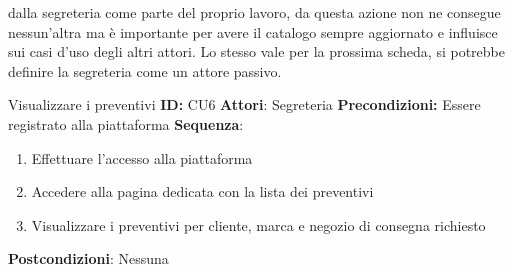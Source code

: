 \documentclass[a4paper, 11pt,oneside]{book}
\begin{document}
        dalla segreteria come parte del proprio lavoro, da questa azione non ne consegue nessun'altra ma è importante per avere il catalogo sempre
        aggiornato e influisce sui casi d'uso degli altri attori. Lo stesso vale per la prossima scheda, si potrebbe definire la segreteria come un attore passivo.
        \begin{mybox}{Visualizzare i preventivi}
            \textbf{ID:} CU6
            \tcbline
            \textbf{Attori}: Segreteria
            \tcbline
            \textbf{Precondizioni:} Essere registrato alla piattaforma
            \tcbline
            \textbf{Sequenza}: 
                \begin{enumerate}
                    \item Effettuare l'accesso alla piattaforma
                    \item Accedere alla pagina dedicata con la lista dei preventivi
                    \item Visualizzare i preventivi per cliente, marca e negozio di consegna richiesto
                \end{enumerate}
            \tcbline
            \textbf{Postcondizioni}: Nessuna
        \end{mybox}



\end{document}
